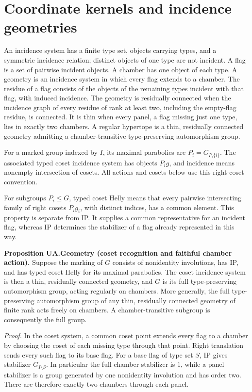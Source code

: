 \section{Coordinate kernels and incidence geometries}\label{coordinate-kernels-and-incidence-geometries}

An incidence system has a finite type set, objects carrying types, and a
symmetric incidence relation; distinct objects of one type are not
incident. A flag is a set of pairwise incident objects. A chamber has
one object of each type. A geometry is an incidence system in which
every flag extends to a chamber. The residue of a flag consists of the
objects of the remaining types incident with that flag, with induced
incidence. The geometry is residually connected when the incidence graph
of every residue of rank at least two, including the empty-flag residue,
is connected. It is thin when every panel, a flag missing just one type,
lies in exactly two chambers. A regular hypertope is a thin, residually
connected geometry admitting a chamber-transitive type-preserving
automorphism group.

For a marked group indexed by \(I\), its maximal parabolics are
\(P_i=G_{I\setminus\{i\}}\). The associated typed coset incidence system
has objects \(P_i g\), and incidence means nonempty intersection of
cosets. All actions and cosets below use this right-coset convention.

For subgroups \(P_i\leq G\), typed coset Helly means that every pairwise
intersecting family of right cosets \(P_i g_i\), with distinct indices,
has a common element. This property is separate from IP. It supplies a
common representative for an incident flag, whereas IP determines the
stabilizer of a flag already represented in this way.

\textbf{Proposition UA.Geometry (coset recognition and faithful chamber
action).} Suppose the marking of \(G\) consists of nonidentity
involutions, has IP, and has typed coset Helly for its maximal
parabolics. The coset incidence system is then a thin, residually
connected geometry, and \(G\) is its full type-preserving automorphism
group, acting regularly on chambers. More generally, the full
type-preserving automorphism group of any thin, residually connected
geometry of finite rank acts freely on chambers. A chamber-transitive
subgroup is consequently the full group.

\emph{Proof.} In the coset system, a common coset point extends every
flag to a chamber by choosing the coset of each missing type through
that point. Right translation sends every such flag to its base flag.
For a base flag of type set \(S\), IP gives stabilizer
\(G_{I\setminus S}\). In particular the full chamber stabilizer is
\(1\), while a panel stabilizer is a group generated by one nonidentity
involution and has order two. There are therefore exactly two chambers
through each panel.

